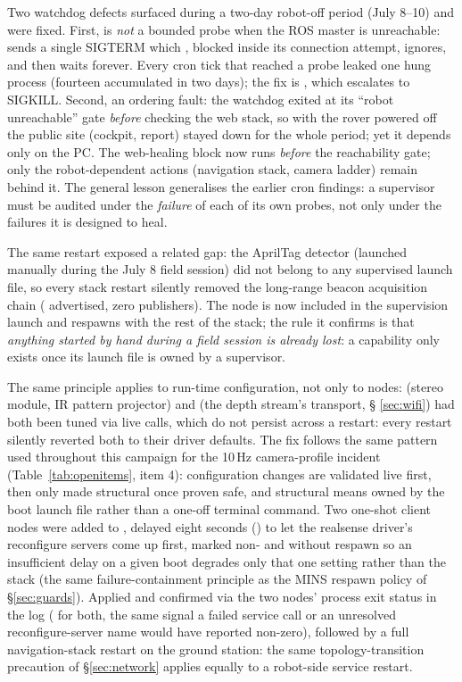 Two watchdog defects surfaced during a two-day robot-off period (July 8--10)
and were fixed. First,  is \emph{not} a
bounded probe when the ROS master is unreachable:  sends a
single SIGTERM which , blocked inside its connection attempt,
ignores, and  then waits forever. Every cron tick that
reached a probe leaked one hung process (fourteen accumulated in two days);
the fix is , which escalates to SIGKILL. Second, an
ordering fault: the watchdog exited at its ``robot unreachable'' gate
\emph{before} checking the web stack, so with the rover powered off the
public site (cockpit, report) stayed down for the whole period; yet it
depends only on the PC. The web-healing block now runs \emph{before} the
reachability gate; only the robot-dependent actions (navigation stack,
camera ladder) remain behind it. The general lesson generalises the earlier
cron findings: a supervisor must be audited under the \emph{failure} of each
of its own probes, not only under the failures it is designed to heal.

The same restart exposed a related gap: the AprilTag detector (launched
manually during the July 8 field session) did not belong to any
supervised launch file, so every stack restart silently removed the
long-range beacon acquisition chain ( advertised,
zero publishers). The node is now included in the supervision launch and
respawns with the rest of the stack; the rule it confirms is that
\emph{anything started by hand during a field session is already lost}:
a capability only exists once its launch file is owned by a supervisor.

The same principle applies to run-time configuration, not only to nodes:
 (stereo module, IR pattern projector) and
 (the depth stream's  transport, \S
\ref{sec:wifi}) had both been tuned via live 
calls, which do not persist across a  restart: every
restart silently reverted both to their driver defaults. The fix follows
the same pattern used throughout this campaign for the 10\,Hz camera-profile
incident (Table~\ref{tab:openitems}, item 4): configuration changes are
validated live first, then only made structural once proven safe, and
structural means owned by the boot launch file rather than a one-off
terminal command. Two one-shot  client nodes were
added to , delayed eight seconds
() to let the realsense
driver's reconfigure servers come up first, marked non- and
without respawn so an insufficient delay on a given boot degrades only that
one setting rather than the stack (the same failure-containment principle as
the MINS respawn policy of \S\ref{sec:guards}). Applied and confirmed via
the two nodes' process exit status in the  log
( for both, the same signal a failed service
call or an unresolved reconfigure-server name would have reported
non-zero), followed by a full navigation-stack restart on the ground
station: the same topology-transition precaution of \S\ref{sec:network}
applies equally to a robot-side service restart.

